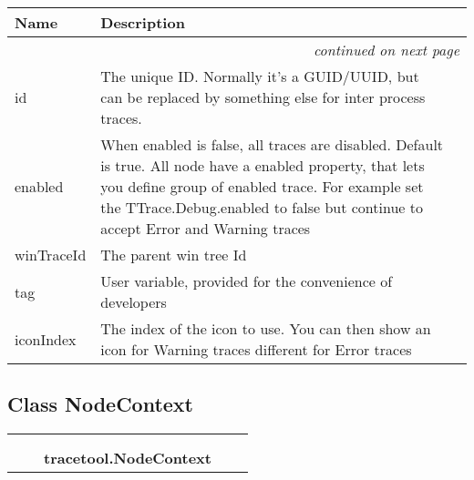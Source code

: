     \vspace{-1cm}
\hspace{\varindent}\begin{longtable}{|p{\varnamewidth}|p{\vardescrwidth}|l}
\cline{1-2}
\cline{1-2} \centering \textbf{Name} & \centering \textbf{Description}& \\
\cline{1-2}
\endhead\cline{1-2}\multicolumn{3}{r}{\small\textit{continued on next page}}\\\endfoot\cline{1-2}
\endlastfoot\raggedright i\-d\- & The unique ID. Normally it's a GUID/UUID, but can be replaced by 
          something else for inter process traces.&\\
\cline{1-2}
\raggedright e\-n\-a\-b\-l\-e\-d\- & When enabled is false, all traces are disabled. Default is true. 
          All node have a enabled property, that lets you define group of 
          enabled trace. For example set the TTrace.Debug.enabled to false 
          but continue to accept Error and Warning traces&\\
\cline{1-2}
\raggedright w\-i\-n\-T\-r\-a\-c\-e\-I\-d\- & The parent win tree Id&\\
\cline{1-2}
\raggedright t\-a\-g\- & User variable, provided for the convenience of developers&\\
\cline{1-2}
\raggedright i\-c\-o\-n\-I\-n\-d\-e\-x\- & The index of the icon to use. You can then show an icon for 
          Warning traces different for Error traces&\\
\cline{1-2}
\end{longtable}



\subsection{Class NodeContext}

    \label{tracetool:NodeContext}
\begin{tabular}{cccccc}
\multicolumn{2}{r}{\settowidth{\BCL}{object}\multirow{2}{\BCL}{object}}
&&
  \\\cline{3-3}
  &&\multicolumn{1}{c|}{}
&&
  \\
&&\multicolumn{2}{l}{\textbf{tracetool.NodeContext}}
\end{tabular}

